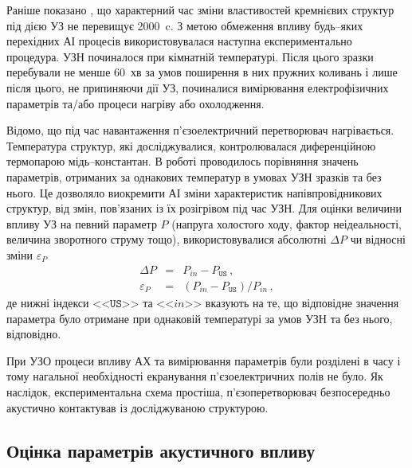 Раніше показано \cite{Ostapenko1995,YOlikhTPL2011,Ostrovskii2001}, що характерний час зміни властивостей кремнієвих структур під дією УЗ не перевищує 2000~c.
З метою обмеження впливу будь--яких перехідних АІ процесів використовувалася наступна експериментально процедура.
УЗН починалося при кімнатній температурі.
Після цього зразки перебували не менше 60~хв за умов поширення в них пружних коливань і лише після цього, не припиняючи дії УЗ, починалися вимірювання електрофізичних параметрів та/або процеси нагріву або охолодження.


Відомо, що під час навантаження п'єзоелектричний перетворювач нагрівається.
Температура структур, які досліджувалися, контролювалася диференційною термопарою мідь--константан.
В роботі проводилось порівняння значень параметрів, отриманих за однакових температур в умовах УЗН зразків та без нього.
Це дозволяло виокремити АІ зміни характеристик напівпровідникових структур, від змін, пов'язаних із їх розігрівом під час УЗН.
Для оцінки величини впливу УЗ на певний параметр $P$ (напруга холостого ходу, фактор неідеальності, величина зворотного струму тощо),
використовувалися абсолютні
$\Delta P$ чи відносні зміни $\varepsilon_P$
\begin{eqnarray}
  \label{eqAbsDelta} \Delta P &=& P_{in}-P_\mathtt{US}\,, \\
  \label{eqEpsDelta} \varepsilon_P &=& (P_{in}-P_\mathtt{US})/P_{in}\,,
\end{eqnarray}
де нижні індекси <<$\mathtt{US}$>> та <<$in$>> вказують на те, що відповідне значення параметра було отримане при однаковій температурі за умов УЗН та без нього, відповідно.

При УЗО процеси впливу АХ та вимірювання параметрів були розділені в часу і тому нагальної необхідності екранування п'єзоелектричних полів не було.
Як наслідок, експериментальна схема простіша, п'єзоперетворювач безпосередньо акустично контактував із досліджуваною структурою.


\subsection{Оцінка параметрів акустичного впливу\label{SC:USL}}


